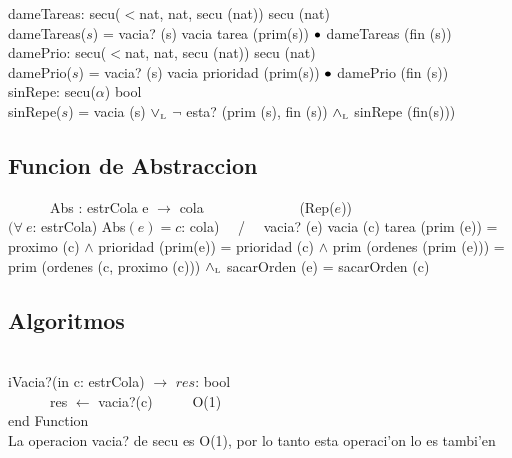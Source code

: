 \documentclass[a4paper,10pt]{article}
\begin{document}
 	  	  	
	  	  	dameTareas: secu($<$nat, nat, secu (nat)) \en secu (nat)\\
 	  	  	\indent dameTareas($s$) = \lif vacia? (s) \lthen vacia \lelse tarea (prim(s)) $\bullet$ dameTareas (fin (s)) \\
 	  	  	
 	  	  	damePrio: secu($<$nat, nat, secu (nat)) \en secu (nat)\\
	  	  	\indent damePrio($s$) = \lif vacia? (s) \lthen vacia \lelse prioridad (prim(s)) $\bullet$ damePrio (fin (s)) \\
 	  	  	
 	  	  	sinRepe: secu($\alpha$) \en bool \\
 	  	  	\indent sinRepe($s$) = vacia (s) $\lor_{\mathrm{\scriptscriptstyle{L}}}$ $\neg$ esta? (prim (s), fin (s)) $\land_{\mathrm{\scriptscriptstyle{L}}}$ sinRepe (fin(s)))\\
 	  	  	
\subsection{Funcion de Abstraccion}
 	  	  	
 	\indent \ \ \ \ \ \ Abs : estrCola e $\rightarrow$ cola \ \ \ \ \ \ \ \ \ \ \ \ \ (Rep($e$))\\
 	  	  	
 	  	  	$(\forall\ e$: estrCola) {Abs$(e) = c$: cola)} \ \ / \ \
 	  	  	\lif vacia? (e) \lthen vacia (c) \lelse tarea (prim (e)) = proximo (c) $\wedge$ prioridad (prim(e)) 	= prioridad (c) $\wedge$ prim (ordenes (prim (e))) = prim (ordenes (c, proximo (c))) $\land_{\mathrm{\scriptscriptstyle{L}}}$ sacarOrden (e) = sacarOrden (c)

\newpage 	  	  	
\subsection{Algoritmos}

\begin{algoritmo}
\caption{}\\
  iVacia?(in c: estrCola) $\rightarrow$ $res$: bool \\
	\indent \ \ \ \ \ \  res $\gets$ vacia?(c)  \ \ \ \ \ O(1)\\
     end Function \\
   
   La operacion vacia? de secu es O(1), por lo tanto esta operaci'on lo es tambi'en
\end{algoritmo}
\end{document}
